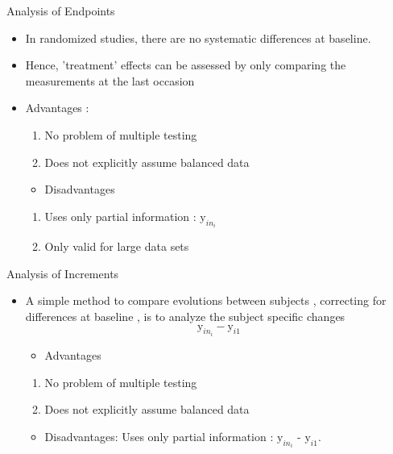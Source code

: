 \documentclass{beamer}
\begin{document}
\begin{frame}{Analysis of Endpoints}
\begin{itemize}
	\item In randomized studies, there are no systematic differences at baseline.
	\item Hence, 'treatment' effects can be assessed by only comparing the measurements at the last occasion
\end{itemize}
\begin{itemize}
\item Advantages : 
\begin{enumerate}
\item No problem of multiple testing 
\item Does not explicitly assume balanced data  
\end{enumerate}
\begin{itemize}
\item Disadvantages 
\end{itemize}
\begin{enumerate}
\item Uses only partial information : $\mbox{y}_{in_{i}}$
\item Only valid for large data sets
\end{enumerate}
\end{itemize}
\end{frame}

\begin{frame}{Analysis of Increments}
\begin{itemize}
	\item  A simple method to compare evolutions between subjects , correcting for differences at baseline , is to analyze the subject specific changes  
	\begin{equation}
	\mbox{y}_{in_{i}}- \mbox{y}_{i1}
	\end{equation}
	
	\begin{itemize}
		\item Advantages
	\end{itemize}
		\begin{enumerate}
		\item  No problem of multiple testing
		\item Does not explicitly assume balanced data 
	\end{enumerate}
		\begin{itemize}
		\item  Disadvantages: Uses only partial information : $\mbox{y}_{in_{i}}$ - $\mbox{y}_{i1}$.
	\end{itemize}
\end{itemize}
\end{frame}
\end{document}

